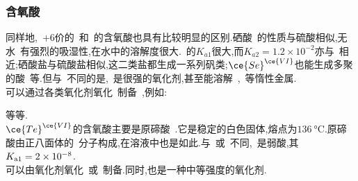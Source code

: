 \documentclass{ctexbook}
\begin{document}
\subsubsection{含氧酸}
同样地,~$+6$价的~和~的含氧酸也具有比较明显的区别.硒酸~的性质与硫酸相似,无水~有强烈的吸湿性,在水中的溶解度很大.~的$K_{a1}$很大,而$K_{a2}=1.2\times10^{-2}$亦与~相近;硒酸盐与硫酸盐相似,这二类盐都生成一系列矾类;$\ce{Se}^{\ce{VI}}$也能生成多聚的酸~等.但与~不同的是,~是很强的氧化剂,甚至能溶解~,~等惰性金属.\\
\indent 可以通过各类氧化剂氧化~制备~,例如:
\begin{tightcenter}
\end{tightcenter}
等等.\\
\indent $\ce{Te}^{\ce{VI}}$的含氧酸主要是原碲酸~.它是稳定的白色固体,熔点为$\SI{136}{\celsius}$.原碲酸由正八面体的~分子构成,在溶液中也是如此.与~或~不同,~是弱酸,其$K_{\text a1}=2\times10^{-8}$.\\
\indent {}可以由氧化剂氧化~或~制备.同时,也是一种中等强度的氧化剂.
\end{document}
